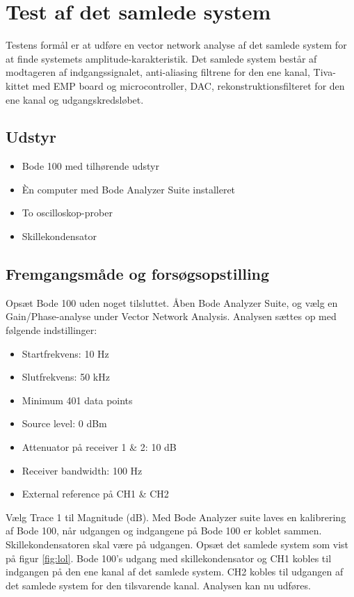 \section{Test af det samlede system}
\label{kap:test}
Testens formål er at udføre en vector network analyse af det samlede system for at finde systemets amplitude-karakteristik. 
Det samlede system består af modtageren af indgangssignalet, anti-aliasing filtrene for den ene kanal, Tiva-kittet med EMP board og microcontroller, DAC, rekonstruktionsfilteret for den ene kanal og udgangskredsløbet. 

\subsection{Udstyr}
\begin{itemize}
	\item Bode 100 med tilhørende udstyr
	\item Èn computer med Bode Analyzer Suite installeret
	\item To oscilloskop-prober
	\item Skillekondensator
\end{itemize}

\subsection{Fremgangsmåde og forsøgsopstilling}
Opsæt Bode 100 uden noget tilsluttet. 
Åben Bode Analyzer Suite, og vælg en Gain/Phase-analyse under Vector Network Analysis. 
Analysen sættes op med følgende indstillinger:
\begin{multicols}{2}
\begin{itemize}
	\item Startfrekvens: 10 Hz
	\item Slutfrekvens: 50 kHz
	\item Minimum 401 data points
	\item Source level: 0 dBm
	\item Attenuator på receiver 1 \& 2: 10 dB
	\item Receiver bandwidth: 100 Hz
	\item External reference på CH1 \& CH2
\end{itemize}
\end{multicols}
Vælg Trace 1 til Magnitude (dB). \newline
Med Bode Analyzer suite laves en kalibrering af Bode 100, når udgangen og indgangene på Bode 100 er koblet sammen. 
Skillekondensatoren skal være på udgangen. \newline
Opsæt det samlede system som vist på figur \ref{fig:lol}. 
Bode 100's udgang med skillekondensator og CH1 kobles til indgangen på den ene kanal af det samlede system. 
CH2 kobles til udgangen af det samlede system for den tilsvarende kanal. 
Analysen kan nu udføres. 

